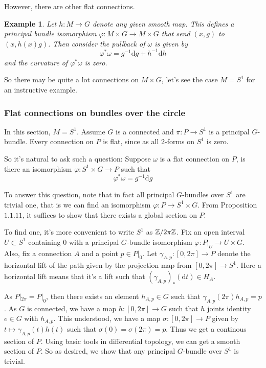 \documentclass[11pt]{amsart}
\numberwithin{equation}{section}
\theoremstyle{plain}
\theoremstyle{plain}
\newtheorem{exsub}[thmsub]{Example}
\numberwithin{equation}{section}
\begin{document}
However, there are other flat connections. 
\begin{exsub}\normalfont
Let $h:M\to G$ denote any given smooth map. This defines a principal bundle isomorphism $\varphi:M\times G\to M\times G$ that send $(x,g)$ to $(x,h(x)g)$. Then consider the pullback of $\omega$ is given by
$$
\varphi^*\omega=g^{-1}\mathrm{d}g+h^{-1}\mathrm{d}h
$$
and the curvature of $\varphi^*\omega$ is zero.
\end{exsub}

So there may be quite a lot connections on $M\times G$, let's see the case $M=S^1$ for an instructive example.
\subsubsection{Flat connections on bundles over the circle}
In this section, $M=S^1$. Assume $G$ is a connected and $\pi:P\to S^1$ is a principal $G$-bundle. Every connection on $P$ is flat, since as all $2$-forms on $S^1$ is zero.

So it's natural to ask such a question: Suppose $\omega$ is a flat connection on $P$, is there an isomorphism $\varphi:S^1\times G\to P$ such that 
$$
\varphi^*\omega=g^{-1}\mathrm{d}g
$$

To answer this question, note that in fact all principal $G$-bundles over $S^1$ are trivial one, that is we can find an isomorphism $\varphi:P\to S^1\times G$. From Proposition $1.1.11$, it suffices to show that there exists a global section on $P$. 

To find one, it's more convenient to write $S^1$ as $\Bbb{Z}/2\pi\Bbb{Z}$. Fix an open interval $U\subset S^1$ containing $0$ with a principal $G$-bundle isomorphism $\varphi:P|_U\to U\times G$. Also, fix a connection $A$ and a point $p\in P|_0$. Let $\gamma_{A,p}:[0,2\pi]\to P$ denote the horizontal lift of the path given by the projection map from $[0,2\pi]\to S^1$. Here a horizontal lift means that it's a lift such that $(\gamma_{A,p})_*(\mathrm{d}t)\in H_A$.

As $P|_{2\pi}=P|_0$, then there exists an element $h_{A,p}\in G$ such that $\gamma_{A,p}(2\pi)h_{A,p}=p$. As $G$ is connected, we have a map $h:[0,2\pi]\to G$ such that $h$ joints identity $e\in G$ with $h_{A,p}$. This understood, we have a map $\sigma:[0,2\pi]\to P$ given by $t\mapsto \gamma_{A,p}(t)h(t)$ such that $\sigma(0)=\sigma(2\pi)=p$. Thus we get a continous section of $P$. Using basic tools in differential topology, we can get a smooth section of $P$. So as desired, we show that any principal $G$-bundle over $S^1$ is trivial.
\end{document}
